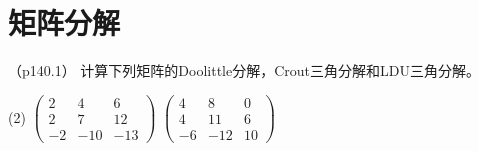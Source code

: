 \documentclass[12pt, a4paper, oneside, UTF8]{ctexbook}
\begin{document}
\else
\fi

\chapter{矩阵分解}
\begin{question}（p140.1）
计算下列矩阵的Doolittle分解，Crout三角分解和LDU三角分解。
\begin{tasks}[label=(\arabic*)](2)
    \task $\begin{pmatrix}
        2 & 4 & 6\\
        2&7&12\\
        -2 & -10& -13
    \end{pmatrix}$
    \task $\begin{pmatrix}
        4 & 8&0\\
        4& 11 & 6\\
        -6 & -12 &10
    \end{pmatrix}$
\end{tasks}
\end{question}
\end{document}
